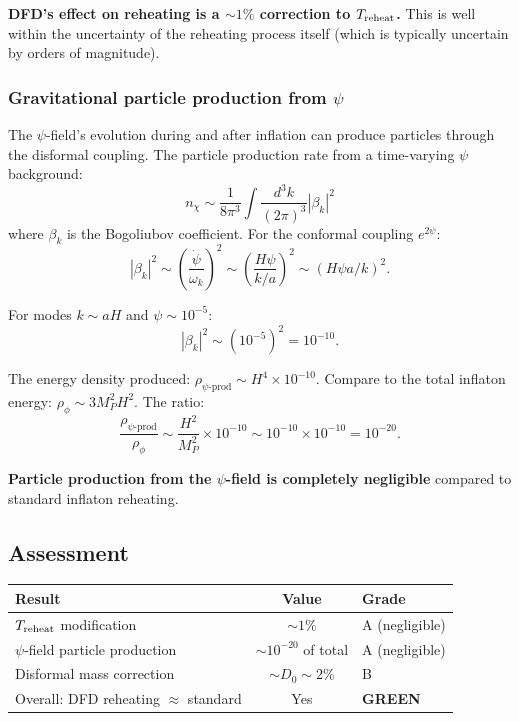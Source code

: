 \documentclass[11pt,a4paper]{article}
\newcommand{\GREEN}{\textcolor{dfdgreen}{\textbf{GREEN}}}
\begin{document}
\textbf{DFD's effect on reheating is a $\sim 1\%$ correction to $T_{\rm reheat}$.} This is well within the uncertainty of the reheating process itself (which is typically uncertain by orders of magnitude).

\subsubsection{Gravitational particle production from $\psi$}

The $\psi$-field's evolution during and after inflation can produce particles through the disformal coupling. The particle production rate from a time-varying $\psi$ background:
\begin{equation}
n_\chi \sim \frac{1}{8\pi^3}\int \frac{d^3k}{(2\pi)^3}|\beta_k|^2
\end{equation}
where $\beta_k$ is the Bogoliubov coefficient. For the conformal coupling $e^{2\psi}$:
\begin{equation}
|\beta_k|^2 \sim \left(\frac{\dot\psi}{\omega_k}\right)^2 \sim \left(\frac{H\psi}{k/a}\right)^2 \sim (H\psi a/k)^2.
\end{equation}

For modes $k \sim aH$ and $\psi \sim 10^{-5}$:
\begin{equation}
|\beta_k|^2 \sim (10^{-5})^2 = 10^{-10}.
\end{equation}

The energy density produced: $\rho_{\psi\text{-prod}} \sim H^4 \times 10^{-10}$. Compare to the total inflaton energy: $\rho_\phi \sim 3M_P^2 H^2$. The ratio:
\begin{equation}
\frac{\rho_{\psi\text{-prod}}}{\rho_\phi} \sim \frac{H^2}{M_P^2} \times 10^{-10} \sim 10^{-10} \times 10^{-10} = 10^{-20}.
\end{equation}

\textbf{Particle production from the $\psi$-field is completely negligible} compared to standard inflaton reheating.

\subsection{Assessment}

\begin{center}
\begin{tabular}{lcl}
\toprule
\textbf{Result} & \textbf{Value} & \textbf{Grade} \\
\midrule
$T_{\rm reheat}$ modification & $\sim 1\%$ & A (negligible) \\
$\psi$-field particle production & $\sim 10^{-20}$ of total & A (negligible) \\
Disformal mass correction & $\sim D_0 \sim 2\%$ & B \\
Overall: DFD reheating $\approx$ standard & Yes & \GREEN \\
\bottomrule
\end{tabular}
\end{center}
\end{document}
